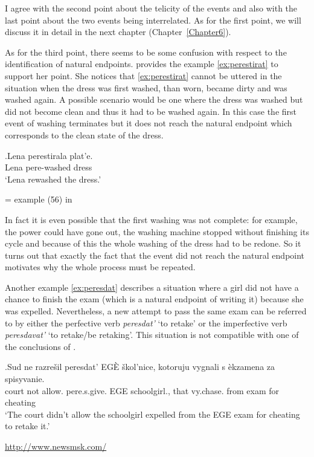 I agree with the second point about the telicity of the events and also with the last point about the two events being interrelated. As for the first point, we will discuss it in detail in the next chapter (Chapter~\ref{Chapter6}). 

As for the third point, there seems to be some confusion with respect to the identification of natural endpoints. \citet{Kagan:book} provides the example \ref{ex:perestirat} to support her point. She notices that \ref{ex:perestirat} cannot be uttered in the situation when the dress was first washed, than worn, became dirty and was washed again. A possible scenario would be one where the dress was washed but did not become clean and thus it had to be washed again. In this case the first event of washing terminates but it does not reach the natural endpoint which corresponds to the clean state of the dress.

\exg.\label{ex:perestirat}Lena perestirala plat'e.\\
Lena pere-washed dress\\
\vspace{0.5em}
`Lena rewashed the dress.'
\begin{flushright}
\vspace{-0.5em}
= example (56) in \citet{Kagan:book}
\end{flushright}

In fact it is even possible that the first washing was not complete: for example, the power could have gone out, the washing machine stopped without finishing its cycle and because of this the whole washing of the dress had to be redone. So it turns out that exactly the fact that the event did not reach the natural endpoint motivates why the whole process must be repeated.

Another example \ref{ex:peresdat} describes a situation where a girl did not have a chance to finish the exam (which is a natural endpoint of writing it) because she was expelled. Nevertheless, a new attempt to pass the same exam can be referred to by either the perfective verb \textit{peresdat'} `to retake' or the imperfective verb \textit{peresdavat'} `to retake/be retaking'. This situation is not compatible with one of the conclusions of \citet{Kagan:book}.

\exg.\label{ex:peresdat}Sud ne razre\v{s}il peresdat' EG\`{E} \v{s}kol'nice, kotoruju vygnali s \`{e}kzamena za spisyvanie.\\
court not allow. pere.s.give. EGE schoolgirl., that vy.chase. from exam for cheating\\
\vspace{0.5em}
`The court didn't allow the schoolgirl expelled from the EGE exam for cheating to retake it.'
\begin{flushright}
\vspace{-0.5em}
\url{http://www.newsmsk.com/}
\end{flushright}

